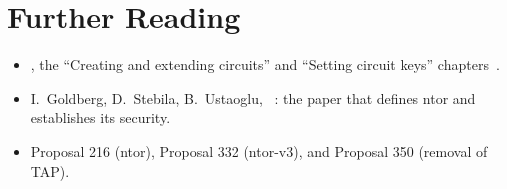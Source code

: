 \section*{Further Reading}
\begin{itemize}
  \item {}, the \enquote{Creating and extending circuits} and \enquote{Setting circuit keys} chapters~\cite{torspec}.
  \item I.~Goldberg, D.~Stebila, B.~Ustaoglu, ~\cite{goldberg2013ntor}: the paper that defines ntor and establishes its security.
  \item Proposal 216 (ntor), Proposal 332 (ntor-v3), and Proposal 350 (removal of TAP).
\end{itemize}
